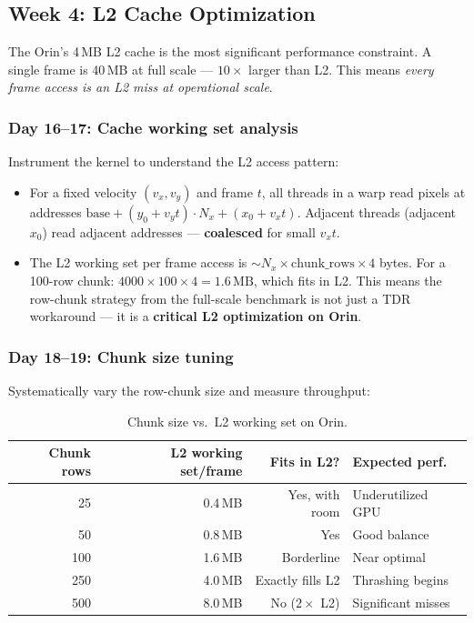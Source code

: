 \documentclass[11pt,letterpaper]{article}
\begin{document}
\subsection{Week 4: L2 Cache Optimization}

The Orin's 4\,MB L2 cache is the most significant performance constraint.
A single frame is 40\,MB at full scale --- $10\times$ larger than L2. This
means \emph{every frame access is an L2 miss at operational scale}.

\subsubsection{Day 16--17: Cache working set analysis}

Instrument the kernel to understand the L2 access pattern:

\begin{itemize}[leftmargin=2em]
    \item For a fixed velocity $(v_x, v_y)$ and frame $t$, all threads in
    a warp read pixels at addresses $\text{base} + (y_0 + v_y t) \cdot N_x
    + (x_0 + v_x t)$. Adjacent threads (adjacent $x_0$) read adjacent
    addresses --- \textbf{coalesced} for small $v_x t$.

    \item The L2 working set per frame access is $\sim N_x \times
    \text{chunk\_rows} \times 4$ bytes. For a 100-row chunk: $4000 \times
    100 \times 4 = 1.6\,\text{MB}$, which fits in L2. This means the
    row-chunk strategy from the full-scale benchmark is not just a TDR
    workaround --- it is a \textbf{critical L2 optimization on Orin}.
\end{itemize}

\subsubsection{Day 18--19: Chunk size tuning}

Systematically vary the row-chunk size and measure throughput:

\begin{table}[h]
\centering
\caption{Chunk size vs.\ L2 working set on Orin.}
\begin{tabular}{@{}rrrl@{}}
\toprule
\textbf{Chunk rows} & \textbf{L2 working set/frame} & \textbf{Fits in L2?} & \textbf{Expected perf.} \\
\midrule
25   & 0.4\,MB  & Yes, with room  & Underutilized GPU \\
50   & 0.8\,MB  & Yes              & Good balance \\
100  & 1.6\,MB  & Borderline       & Near optimal \\
250  & 4.0\,MB  & Exactly fills L2 & Thrashing begins \\
500  & 8.0\,MB  & No ($2\times$ L2)& Significant misses \\
\bottomrule
\end{tabular}
\end{table}
\end{document}
